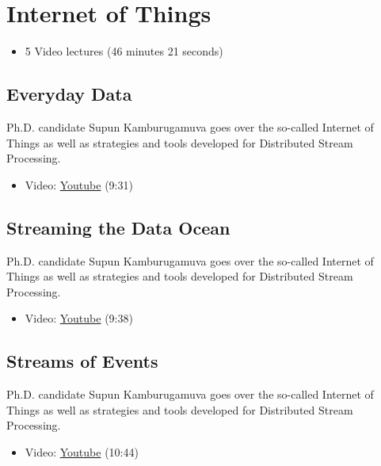 \section{Internet of Things}\label{internet-of-things}

\begin{itemize}
\tightlist
\item
  5 Video lectures (46 minutes 21 seconds)
\end{itemize}

\subsection{Everyday Data}\label{everyday-data}

Ph.D. candidate Supun Kamburugamuva goes over the so-called Internet of
Things as well as strategies and tools developed for Distributed Stream
Processing.

\begin{itemize}
\tightlist
\item
  Video:
  \href{https://www.youtube.com/watch?time_continue=9\&v=brv48Tg7Zyw}{Youtube}
  (9:31)
\end{itemize}

\subsection{Streaming the Data Ocean}\label{streaming-the-data-ocean}

Ph.D. candidate Supun Kamburugamuva goes over the so-called Internet of
Things as well as strategies and tools developed for Distributed Stream
Processing.

\begin{itemize}
\tightlist
\item
  Video: \href{https://www.youtube.com/watch?v=hTbveHCjAo4}{Youtube}
  (9:38)
\end{itemize}

\subsection{Streams of Events}\label{streams-of-events}

Ph.D. candidate Supun Kamburugamuva goes over the so-called Internet of
Things as well as strategies and tools developed for Distributed Stream
Processing.

\begin{itemize}
\tightlist
\item
  Video: \href{https://www.youtube.com/watch?v=Ok2Bo8D0EkE}{Youtube}
  (10:44)
\end{itemize}

